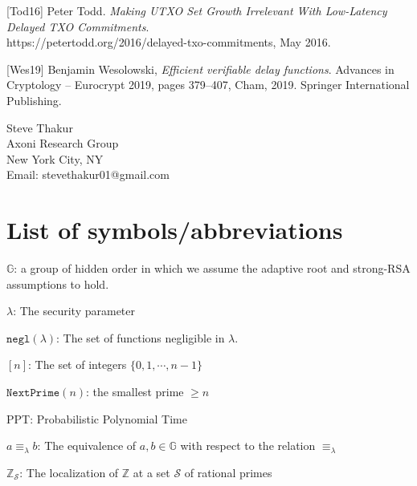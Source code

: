 \documentclass[11pt, lettersize, notitlepage, leqno, footskip=0.6cm]{article}
\newcommand{\bz}{\mathbb Z}
\newcommand{\ttt}{\texttt}
\newcommand{\negl}{\ttt{{negl}}}
\newcommand{\eqlam}{\equiv_{\lam}}
\newcommand{\mc}{\mathcal}
\newcommand{\mb}{\mathbb}
\newcommand{\lam}{\lambda}
\newcommand{\noin}{\noindent}
\numberwithin{equation}{section}
\begin{document}
{{{\noin \hypertarget{Tod16}{[Tod16]} Peter Todd. \textit{Making UTXO Set Growth Irrelevant With Low-Latency Delayed TXO Commitments}.\\ https://petertodd.org/2016/delayed-txo-commitments, May 2016.\vspace{0.1cm}

\noin \hypertarget{Wes18}{[Wes19]} Benjamin Wesolowski, \textit{Efficient verifiable delay functions}. Advances in Cryptology – Eurocrypt 2019, pages 379–407, Cham, 2019. Springer International Publishing.\vspace{0.1cm}




\bigskip

\normalsize

\noin Steve Thakur\\
Axoni Research Group\\
New York City, NY\\
Email: stevethakur01@gmail.com 


\newpage

\appendix

\section{\fontsize{11}{11}\selectfont List of symbols/abbreviations  }

\noin $\mb{G}$: a group of hidden order in which we assume the adaptive root and strong-RSA assumptions to hold. \vspace{0.1cm}

\noin $\lam$: The security parameter \vspace{0.1cm}

\noin $\negl(\lam)$: The set of functions negligible in $\lam$. \vspace{0.1cm}

\noin $[n]$: The set of integers $\{0,1,\cdots,n-1 \}$ \vspace{0.1cm}

\noin $\ttt{NextPrime}(n)$: the smallest prime $\geq n$ \vspace{0.1cm}

\noin PPT: Probabilistic Polynomial Time \vspace{0.1cm}

\noin $a\eqlam b$: The equivalence of $a,b\in\mb{G}$ with respect to the relation $\eqlam$ \vspace{0.1cm}

\noin $\bz_{\mc{S}}$: The localization of $\bz$ at a set $\mc{S}$ of rational primes \vspace{0.1cm}

}}}
\end{document}
